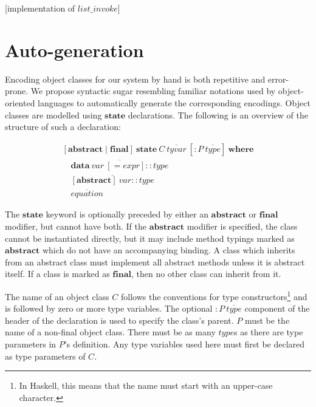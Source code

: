 \documentclass[runningheads,a4paper]{llncs}
\newcommand{\todo}[1]{[{\color{blue}#1}]}
\begin{document}
\todo{implementation of $\mathit{list}\_\mathit{invoke}$}

\section{Auto-generation}
\label{sec:auto}

Encoding object classes for our system by hand is both repetitive and error-prone. We propose syntactic sugar resembling familiar notations used by object-oriented languages to automatically generate the corresponding encodings. Object classes are modelled using $\mathbf{state}$ declarations. The following is an overview of the structure of such a declaration:

\begin{displaymath}
\begin{array}{l}
[\mathbf{abstract} \mid \mathbf{final}]~\mathbf{state}~\mathit{C}~\overline{\mathit{tyvar}}~[: P~\overline{\mathit{type}}]~\mathbf{where} \\
\quad \overline{\mathbf{data}~\mathit{var}~[= \mathit{expr}] :: \mathit{type}} \\
\quad \overline{[\mathbf{abstract}]~\mathit{var} :: \mathit{type}} \\
\quad \overline{\mathit{equation}}
\end{array}
\end{displaymath}

The $\mathbf{state}$ keyword is optionally preceded by either an $\mathbf{abstract}$ or $\mathbf{final}$ modifier, but cannot have both. If the $\mathbf{abstract}$ modifier is specified, the class cannot be instantiated directly, but it may include method typings marked as $\mathbf{abstract}$ which do not have an accompanying binding. A class which inherits from an abstract class must implement all abstract methods unless it is abstract itself. If a class is marked as $\mathbf{final}$, then no other class can inherit from it.

The name of an object class $C$ follows the conventions for type constructors\footnote{In Haskell, this means that the name must start with an upper-case character.} and is followed by zero or more type variables. The optional $: \mathit{P}~\overline{\mathit{type}}$ component of the header of the declaration is used to specify the class's parent. $P$ must be the name of a non-final object class. There must be as many $\mathit{type}$s as there are type parameters in $P$'s definition. Any type variables used here must first be declared as type parameters of $C$.
\end{document}
